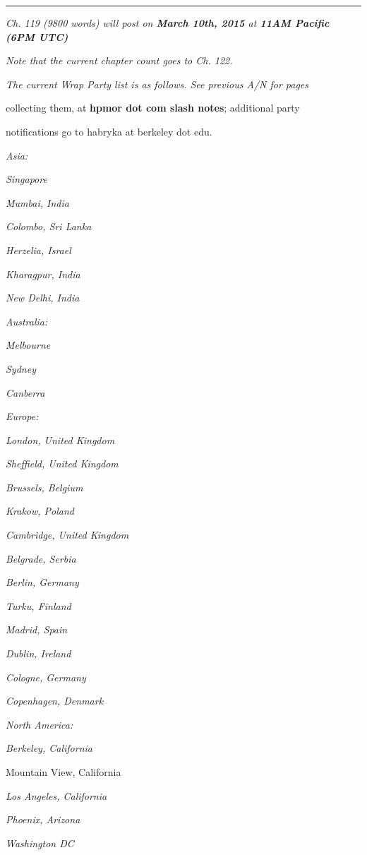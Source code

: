 \begin{center}\rule{3in}{0.4pt}\end{center}

\emph{Ch. 119 (9800 words) will post on \textbf{March 10th, 2015} at \textbf{11AM Pacific (6PM UTC)}}

\emph{Note that the current chapter count goes to Ch. 122.}

\emph{The current Wrap Party list is as follows. See previous A/N for pages}

collecting them, at \textbf{hpmor dot com slash notes}; additional party

notifications go to habryka at berkeley dot edu.

\emph{Asia:}

\emph{Singapore}

\emph{Mumbai, India}

\emph{Colombo, Sri Lanka}

\emph{Herzelia, Israel}

\emph{Kharagpur, India}

\emph{New Delhi, India}

\emph{Australia:}

\emph{Melbourne}

\emph{Sydney}

\emph{Canberra}

\emph{Europe:}

\emph{London, United Kingdom}

\emph{Sheffield, United Kingdom}

\emph{Brussels, Belgium}

\emph{Krakow, Poland}

\emph{Cambridge, United Kingdom}

\emph{Belgrade, Serbia}

\emph{Berlin, Germany}

\emph{Turku, Finland}

\emph{Madrid, Spain}

\emph{Dublin, Ireland}

\emph{Cologne, Germany}

\emph{Copenhagen, Denmark}

\emph{North America:}

\emph{Berkeley, California}

Mountain View, California

\emph{Los Angeles, California}

\emph{Phoenix, Arizona}

\emph{Washington DC}

